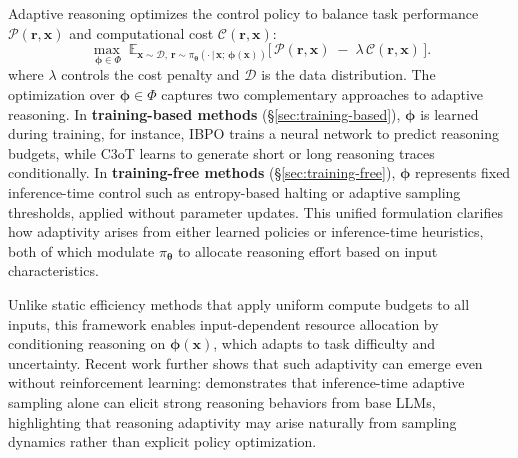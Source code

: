 \documentclass[11pt]{article}
\begin{document}
Adaptive reasoning optimizes the control policy to balance task performance $\mathcal{P}(\boldsymbol{r}, \mathbf{x})$ and computational cost $\mathcal{C}(\boldsymbol{r}, \mathbf{x})$:
\begin{equation}
\label{eq:new adapt}
\max_{\ \boldsymbol{\phi}\in\Phi}\;
\mathbb{E}_{\mathbf{x}\sim\mathcal{D},\, \boldsymbol{r}\sim \pi_{\boldsymbol{\theta}}(\cdot\,|\,\mathbf{x};\,\boldsymbol{\phi}(\mathbf{x}))}
\big[\,\mathcal{P}(\boldsymbol{r},\mathbf{x}) \;-\; \lambda\,\mathcal{C}(\boldsymbol{r},\mathbf{x})\,\big].
\end{equation}
where $\lambda$ controls the cost penalty and $\mathcal{D}$ is the data distribution.
The optimization over $\boldsymbol{\phi} \in \Phi$ captures two complementary approaches to adaptive reasoning. In \textbf{training-based methods} (\S\ref{sec:training-based}), $\boldsymbol{\phi}$ is learned during training, for instance, IBPO \citep{Yu2025IBPO} trains a neural network to predict reasoning budgets, while C3oT \citep{kang2025c3ot} learns to generate short or long reasoning traces conditionally. In \textbf{training-free methods} (\S\ref{sec:training-free}), $\boldsymbol{\phi}$ represents fixed inference-time control such as entropy-based halting \citep{laaouach2025halt} or adaptive sampling thresholds, applied without parameter updates. This unified formulation clarifies how adaptivity arises from either learned policies or inference-time heuristics, both of which modulate $\pi_{\boldsymbol{\theta}}$ to allocate reasoning effort based on input characteristics.

Unlike static efficiency methods that apply uniform compute budgets to all inputs, this framework enables {input-dependent resource allocation} by conditioning reasoning on $\boldsymbol{\phi}(\mathbf{x})$, which adapts to task difficulty and uncertainty. Recent work further shows that such adaptivity can emerge even without reinforcement learning: 
\citet{karan2025reasoning} demonstrates that inference-time adaptive sampling alone 
can elicit strong reasoning behaviors from base LLMs, 
highlighting that reasoning adaptivity may arise naturally from sampling dynamics 
rather than explicit policy optimization.
\end{document}
